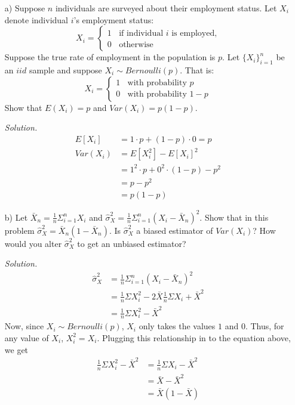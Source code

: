 \documentclass[
]{article}
\begin{document}
\begin{enumerate}

\item[a)] Suppose $n$ individuals are surveyed about their employment status. Let $X_i$ denote individual $i$’s employment status:
\[X_i = \begin{cases} 1 \;\; \text{  if individual } i \text{ is employed,} \\
0 \;\;\text{  otherwise}\end{cases} \]
Suppose the true rate of employment in the population is $p$. Let $\{X_i\}^n_{i=1}$ be an $iid$ sample and suppose $X_i ∼ Bernoulli(p)$. That is:
\[X_i = \begin{cases} 1 \;\; \text{  with probability } p \\
0 \;\;\text{  with probability } 1-p\end{cases}\]
Show that $E(X_i) = p$ and $Var(X_i) = p(1-p)$.  
  
\textit{Solution.}  
\[\begin{aligned}
E[X_i] &= 1 \cdot p + (1-p) \cdot 0 = p\\
Var(X_i) &= E[X_i ^2] - E[X_i] ^2 \\
&= 1^2 \cdot p + 0^2 \cdot (1-p) - p^2 \\
&= p - p^2 \\
&= p(1-p)
\end{aligned}\]

\item[b)] Let $\bar{X}_n = \frac{1}{n}\Sigma ^n _{i=1} X_i$ and $\hat{\sigma}^2_X = \frac{1}{n} \Sigma ^n _{i = 1} (X_i - \bar{X}_n)^2$. Show that in this problem $\hat{\sigma}^2_X = \bar{X}_n(1-\bar{X}_n)$. Is $\hat{\sigma}^2_X$ a biased estimator of $Var(X_i)$? How would you alter $\hat{\sigma}^2_X$ to get an unbiased estimator?  
  
\textit{Solution.} 
\[\begin{aligned}
\hat{\sigma}^2_X &= \frac{1}{n} \Sigma ^n _{i = 1} (X_i - \bar{X}_n)^2 \\
&= \frac{1}{n}\Sigma X_i^2 - 2\bar{X}\frac{1}{n}\Sigma X_i + \bar{X} ^2 \\
&= \frac{1}{n}\Sigma X_i^2 -  \bar{X}^2
\end{aligned}\]
Now, since $X_i \sim Bernoulli(p)$, $X_i$ only takes the values $1$ and $0$. Thus, for any value of $X_i$, $X_i ^2 = X_i$. Plugging this relationship in to the equation above, we get 
\[\begin{aligned}
\frac{1}{n}\Sigma X_i^2 -  \bar{X}^2 &= \frac{1}{n} \Sigma X_i - \bar{X}^2 \\
&= \bar{X} - \bar{X} ^2 \\
&= \bar{X}(1-\bar{X})
\end{aligned}\]


\end{enumerate}
\end{document}
